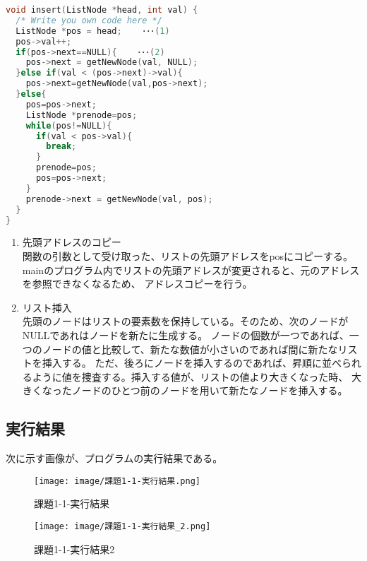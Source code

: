 \documentclass[a4j]{ltjsarticle}
\begin{document}
      \begin{lstlisting}[language=C,caption=課題1-1(insert関数)]
void insert(ListNode *head, int val) {
  /* Write you own code here */
  ListNode *pos = head;    ･･･(1)
  pos->val++;
  if(pos->next==NULL){    ･･･(2)
    pos->next = getNewNode(val, NULL);
  }else if(val < (pos->next)->val){
    pos->next=getNewNode(val,pos->next);
  }else{
    pos=pos->next;
    ListNode *prenode=pos;
    while(pos!=NULL){
      if(val < pos->val){
        break;
      }
      prenode=pos;
      pos=pos->next;
    }
    prenode->next = getNewNode(val, pos);
  }
}
      \end{lstlisting}
      \begin{enumerate}
        \item 先頭アドレスのコピー
        \\ \indent 関数の引数として受け取った、リストの先頭アドレスをposにコピーする。
        mainのプログラム内でリストの先頭アドレスが変更されると、元のアドレスを参照できなくなるため、
        アドレスコピーを行う。
        \item リスト挿入
        \\ \indent 先頭のノードはリストの要素数を保持している。そのため、次のノードがNULLであれはノードを新たに生成する。
        ノードの個数が一つであれば、一つのノードの値と比較して、新たな数値が小さいのであれば間に新たなリストを挿入する。
        ただ、後ろにノードを挿入するのであれば、昇順に並べられるように値を捜査する。挿入する値が、リストの値より大きくなった時、
        大きくなったノードのひとつ前のノードを用いて新たなノードを挿入する。
      \end{enumerate}
    \subsection{実行結果}
      次に示す画像が、プログラムの実行結果である。
    \begin{figure}[h]
      \centering
      \begin{minipage}[b]{0.49\columnwidth}
          \centering
          \texttt{[image: image/課題1-1-実行結果.png]}
          \caption{課題1-1-実行結果}
          \label{fig:課題1-1-実行結果}
      \end{minipage}
      \begin{minipage}[b]{0.49\columnwidth}
          \centering
          \texttt{[image: image/課題1-1-実行結果\_2.png]}
          \caption{課題1-1-実行結果2}
          \label{fig:課題1-1-実行結果_2}
      \end{minipage}
    \end{figure}
      
\end{document}
